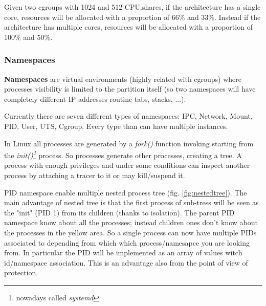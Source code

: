 Given two cgroups with 1024 and 512 CPU.shares, if the architecture has a single core, resources will be allocated with a proportion of 66\% and 33\%.
Instead if the architecture has multiple cores, resources will be allocated with a proportion of 100\% and 50\%.

\subsubsection{Namespaces}
\textbf{Namespaces} are virtual environments (highly related with cgroups) where processes visibility is limited to the partition itself (so two namespaces will have completely different IP addresses routine tabs, stacks, ...).

Currently there are seven different types of namespaces: IPC, Network, Mount, PID, User, UTS, Cgroup. Every type than can have multiple instances.

In Linux all processes are generated by a \textit{fork()} function invoking starting from the \textit{init()\footnote{nowadays called \textit{systemd}}} process. So processes generate other processes, creating a tree. A process with enough privileges and under some conditions can inspect another process by attaching a tracer to it or may kill/suspend it.

PID namespace enable multiple nested process tree (fig. \ref{fig:nestedtree}).
The main advantage of nested tree is that the first process of sub-tress will be seen as the "init" (PID 1) from its children (thanks to isolation).
The parent PID namespace know about all the processes; instead children ones don't know about the processes in the yellow area.
So a single process can now have multiple PIDs associated to depending from which which process/namesapce you are looking from. In particular the PID will be implemented as an array of values witch id/namespace association. This is an advantage also from the point of view of protection.

